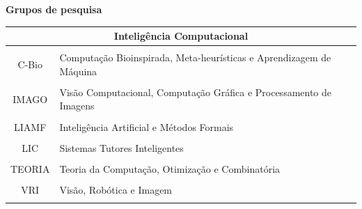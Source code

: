 \documentclass[10pt,
  aspectratio=169,
  serif,
  mathserif,
  professionalfont,
  compress,
  handout,
  ]{beamer}\usepackage[]{graphicx}\usepackage[]{color}
\begin{document}
\begin{frame}[c, allowframebreaks]
  
  \textbf{Grupos de pesquisa}
  
  \begin{table}[]
\begin{tabular}{cl}
\hline
\multicolumn{2}{c}{Inteligência Computacional}                                             \\ \hline
\multicolumn{1}{l}{} 
                     &                                                                     \\
C-Bio                & Computação Bioinspirada, Meta-heurísticas e Aprendizagem de Máquina \\
\multicolumn{1}{l}{} &                                                                     \\
IMAGO                & Visão Computacional, Computação Gráfica e Processamento de Imagens  \\
\multicolumn{1}{l}{} &                                                                     \\
LIAMF                & Inteligência Artificial e Métodos Formais                           \\
\multicolumn{1}{l}{} &                                                                     \\
LIC                  & Sistemas Tutores Inteligentes                                       \\
\multicolumn{1}{l}{} &                                                                     \\
TEORIA               & Teoria da Computação, Otimização e Combinatória                     \\
\multicolumn{1}{l}{} &                                                                     \\
VRI                  & Visão, Robótica e Imagem                                            \\
                     &                                                                     \\ \hline
\end{tabular}
\label{tab:my-table}
\end{table}

\end{frame}
\end{document}
